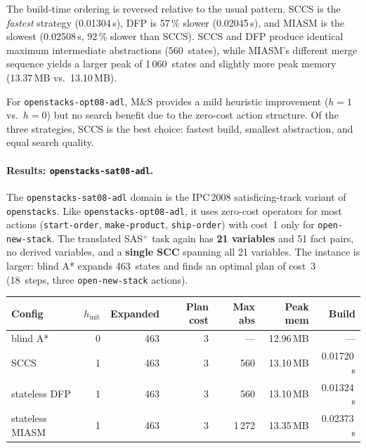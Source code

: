 \documentclass[11pt,a4paper]{article}
\begin{document}
The build-time ordering is reversed relative to the usual pattern.
SCCS is the \emph{fastest} strategy (0.01304\,s), DFP is 57\,\% slower
(0.02045\,s), and MIASM is the slowest (0.02508\,s, 92\,\% slower than SCCS).
SCCS and DFP produce identical maximum intermediate abstractions (560~states),
while MIASM's different merge sequence yields a larger peak of 1\,060~states
and slightly more peak memory (13.37\,MB vs.\ 13.10\,MB).

For \texttt{openstacks-opt08-adl}, M\&S provides a mild heuristic improvement
($h=1$ vs.\ $h=0$) but no search benefit due to the zero-cost action structure.
Of the three strategies, SCCS is the best choice: fastest build, smallest
abstraction, and equal search quality.

\paragraph{Results: \texttt{openstacks-sat08-adl}.}

The \texttt{openstacks-sat08-adl} domain is the IPC\,2008 satisficing-track
variant of \texttt{openstacks}.
Like \texttt{openstacks-opt08-adl}, it uses zero-cost operators for most
actions (\texttt{start-order}, \texttt{make-product}, \texttt{ship-order})
with cost~1 only for \texttt{open-new-stack}.
The translated SAS$^+$ task again has \textbf{21 variables} and 51 fact pairs,
no derived variables, and a \textbf{single SCC} spanning all 21 variables.
The instance is larger: blind A* expands 463~states and finds an optimal plan
of cost~3 (18~steps, three \texttt{open-new-stack} actions).

\begin{center}
\small
\begin{tabular}{lrrrrrr}
\toprule
\textbf{Config} & \textbf{$h_{\mathrm{init}}$} & \textbf{Expanded}
  & \textbf{Plan cost} & \textbf{Max abs} & \textbf{Peak mem} & \textbf{Build} \\
\midrule
blind A*            & 0 & 463 & 3 & ---    & 12.96\,MB & ---       \\
SCCS                & 1 & 463 & 3 & 560    & 13.10\,MB & 0.01720\,s  \\
stateless DFP       & 1 & 463 & 3 & 560    & 13.10\,MB & 0.01324\,s  \\
stateless MIASM     & 1 & 463 & 3 & 1\,272 & 13.35\,MB & 0.02373\,s  \\
\bottomrule
\end{tabular}
\end{center}
\end{document}
